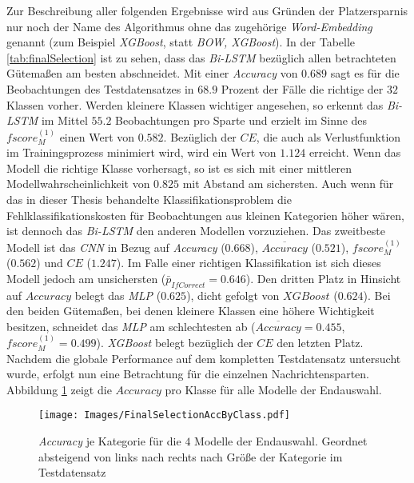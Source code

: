 \documentclass[a4paper,11pt]{article}
\begin{document}
Zur Beschreibung aller folgenden Ergebnisse wird aus Gründen der Platzersparnis nur noch der Name des Algorithmus ohne das zugehörige \textit{Word-Embedding} genannt (zum Beispiel \textit{XGBoost}, statt \textit{BOW, XGBoost}).
In der Tabelle \ref{tab:finalSelection} ist zu sehen, dass das \textit{Bi-LSTM} bezüglich allen betrachteten Gütemaßen am besten abschneidet. Mit einer \textit{Accuracy} von $0.689$ sagt es für die Beobachtungen des Testdatensatzes in $68.9$ Prozent der Fälle die richtige der $32$ Klassen vorher. Werden kleinere Klassen wichtiger angesehen, so erkennt das \textit{Bi-LSTM} im Mittel $55.2$ Beobachtungen pro Sparte und erzielt im Sinne des $fscore_M^{(1)}$ einen Wert von $0.582$. Bezüglich der $CE$, die auch als Verlustfunktion im Trainingsprozess minimiert wird, wird ein Wert von $1.124$ erreicht. Wenn das Modell die richtige Klasse vorhersagt, so ist es sich mit einer mittleren Modellwahrscheinlichkeit von $0.825$ mit Abstand am sichersten. Auch wenn für das in dieser Thesis behandelte Klassifikationsproblem die Fehlklassifikationskosten für Beobachtungen aus kleinen Kategorien höher wären, ist dennoch das \textit{Bi-LSTM} den anderen Modellen vorzuziehen. Das zweitbeste Modell ist das \textit{CNN} in Bezug auf \textit{Accuracy} ($0.668$),  $\overline{Accuracy}$ ($0.521$), $fscore_M^{(1)}$ ($0.562$) und $CE$ ($1.247$). Im Falle einer richtigen Klassifikation ist sich dieses Modell jedoch am unsichersten ($\bar{p}_{IfCorrect} =0.646$). Den dritten Platz in Hinsicht auf $Accuracy$ belegt das \textit{MLP} ($0.625$), dicht gefolgt von $XGBoost$ ($0.624$). Bei den beiden Gütemaßen, bei denen kleinere Klassen eine höhere Wichtigkeit besitzen, schneidet das \textit{MLP} am schlechtesten ab ($\overline{Accuracy} = 0.455$, $fscore_M^{(1)} = 0.499$). \textit{XGBoost} belegt bezüglich der $CE$ den letzten Platz.\\
Nachdem die globale Performance auf dem kompletten Testdatensatz untersucht wurde, erfolgt nun eine Betrachtung für die einzelnen Nachrichtensparten. Abbildung \ref{abb:AccByClass} zeigt die $Accuracy$ pro Klasse für alle Modelle der Endauswahl.

\begin{figure}[ht]
    \centering
\texttt{[image: Images/FinalSelectionAccByClass.pdf]} 
\caption{\textit{Accuracy} je Kategorie für die $4$ Modelle der Endauswahl. Geordnet absteigend von links nach rechts nach Größe der Kategorie im Testdatensatz}
\label{abb:AccByClass}
\end{figure}
\end{document}
